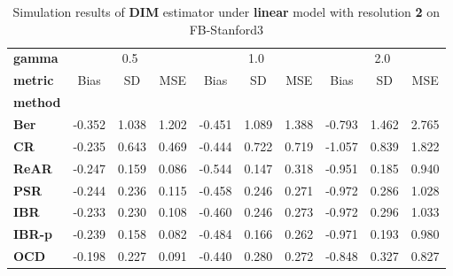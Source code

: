 \begin{table}
\centering
\caption{Simulation results of \textbf{DIM} estimator under \textbf{linear} model with resolution \textbf{2} on FB-Stanford3}
\begin{tabular}{lccccccccc}
\toprule
\textbf{gamma} & \multicolumn{3}{c}{0.5} & \multicolumn{3}{c}{1.0} & \multicolumn{3}{c}{2.0} \\
\textbf{metric} &   Bias &     SD &    MSE &   Bias &     SD &    MSE &   Bias &     SD &    MSE \\
\textbf{method} &        &        &        &        &        &        &        &        &        \\
\midrule
\textbf{Ber} & -0.352 &  1.038 &  1.202 & -0.451 &  1.089 &  1.388 & -0.793 &  1.462 &  2.765 \\
\textbf{CR} & -0.235 &  0.643 &  0.469 & -0.444 &  0.722 &  0.719 & -1.057 &  0.839 &  1.822 \\
\textbf{ReAR} & -0.247 &  0.159 &  0.086 & -0.544 &  0.147 &  0.318 & -0.951 &  0.185 &  0.940 \\
\textbf{PSR} & -0.244 &  0.236 &  0.115 & -0.458 &  0.246 &  0.271 & -0.972 &  0.286 &  1.028 \\
\textbf{IBR} & -0.233 &  0.230 &  0.108 & -0.460 &  0.246 &  0.273 & -0.972 &  0.296 &  1.033 \\
\textbf{IBR-p} & -0.239 &  0.158 &  0.082 & -0.484 &  0.166 &  0.262 & -0.971 &  0.193 &  0.980 \\
\textbf{OCD} & -0.198 &  0.227 &  0.091 & -0.440 &  0.280 &  0.272 & -0.848 &  0.327 &  0.827 \\
\bottomrule
\end{tabular}
\end{table}
